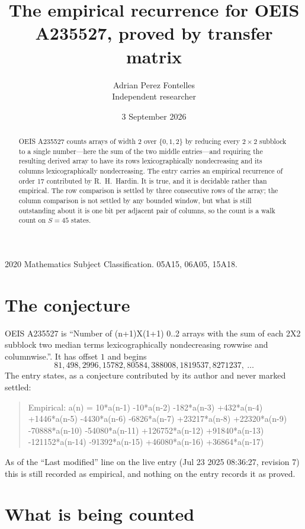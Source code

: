 \documentclass[11pt,a4paper]{article}
\title{The empirical recurrence for OEIS A235527, proved by transfer matrix}
\author{Adrian Perez Fontelles\\ \small Independent researcher}
\date{3 September 2026}
\theoremstyle{plain}
\theoremstyle{definition}
\begin{document}
\maketitle

\begin{abstract}
OEIS A235527 counts arrays of width $2$ over $\{0,1,2\}$ by reducing every $2\times2$ subblock to a
single number---here the sum of the two middle entries---and requiring the resulting derived array to have its rows
lexicographically nondecreasing and its columns lexicographically nondecreasing. The entry carries an
empirical recurrence of order $17$ contributed by R.~H.~Hardin. It is true, and it is
decidable rather than empirical. The row comparison is settled by three consecutive rows of the
array; the column comparison is not settled by any bounded window, but what is still outstanding
about it is one bit per adjacent pair of columns, so the count is a walk count on $S=45$
states.
\end{abstract}

\noindent\small 2020 Mathematics Subject Classification. 05A15, 06A05, 15A18.\normalsize

\section{The conjecture}

OEIS A235527 is ``Number of (n+1)X(1+1) 0..2 arrays with the sum of each 2X2 subblock two median terms lexicographically nondecreasing rowwise and columnwise.''. It has offset $1$ and begins
\[
81, 498, 2996, 15782, 80584, 388008, 1819537, 8271237,\ \dots
\]
The entry states, as a conjecture contributed by its author and never marked settled:
\begin{quote}
Empirical: a(n) = 10*a(n-1) -10*a(n-2) -182*a(n-3) +432*a(n-4) +1446*a(n-5) -4430*a(n-6) -6826*a(n-7) +23217*a(n-8) +22320*a(n-9) -70888*a(n-10) -54080*a(n-11) +126752*a(n-12) +91840*a(n-13) -121152*a(n-14) -91392*a(n-15) +46080*a(n-16) +36864*a(n-17)
\end{quote}
As of the ``Last modified'' line on the live entry (Jul 23 2025 08:36:27, revision 7) this is still
recorded as empirical, and nothing on the entry records it as proved.

\section{What is being counted}
\end{document}
